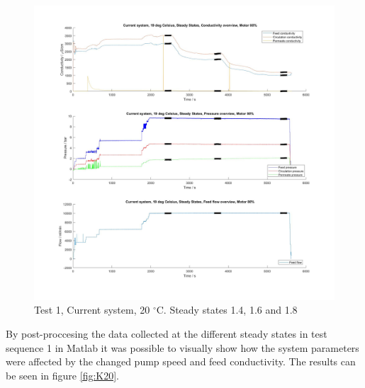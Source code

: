 \begin{figure}[H]
    \centering
    \includegraphics[width=1\textwidth]{overview20_80}
    \caption{Test 1, Current system, 20 $^{\circ}$C. Steady states 1.4, 1.6 and 1.8}
    \label{fig:SteadyStates20C_2}
\end{figure}

\newpage

By post-proccesing the data collected at the different steady states in test sequence 1 in Matlab it was possible to visually show how the system parameters were affected by the changed pump speed and feed conductivity. The results can be seen in figure \ref{fig:K20}.  


